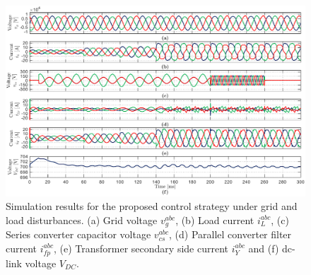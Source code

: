 \begin{figure}
    \centering
    \includegraphics[width=\textwidth]{Images/Simulation_Results.pdf}
    \caption{Simulation results for the proposed control strategy under grid and load disturbances. (a) Grid voltage $v_g^{abc}$, (b) Load current $i_L^{abc}$, (c) Series converter capacitor voltage $v_{cs}^{abc}$, (d) Parallel converter filter current $i_{fp}^{abc}$, (e) Transformer secondary side current $i_Y^{abc}$ and (f) dc-link voltage $V_{DC}$.}
    \label{fig:Sim_results}
\end{figure}